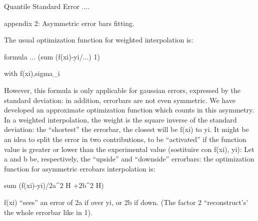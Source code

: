 Quantile Standard Error ....





appendix 2: Asymmetric error bars fitting.

The usual optimization function for weighted interpolation is:

formula ... (sum (f(xi)-yi/...)     1)

with f(xi),sigma_i

However, this formula is only applicable for gaussian errors, expressed by the standard deviation: in addition, errorbars are not even symmetric.
We have developed an approximate optimization function which counts in this asymmetry.
In a weighted interpolation, the weight is the square inverse of the standard deviation: the ``shortest'' the errorbar, the closest will be f(xi) to yi.
It might be an idea to split the error in two contributions, to be ``activated'' if the function value is greater or lower than the experimental value (sostituire con f(xi), yi):
Let a and b be, respectively, the ``upside'' and ``downside'' errorbars: the optimization function for asymmetric errobars interpolation is:

sum (f(xi)-yi)/2a^2 H +2b^2 H)


f(xi) ``sees'' an error of 2a if over yi, or 2b if down. (The factor 2 ``reconstruct's' the whole errorbar like in 1).


 





 